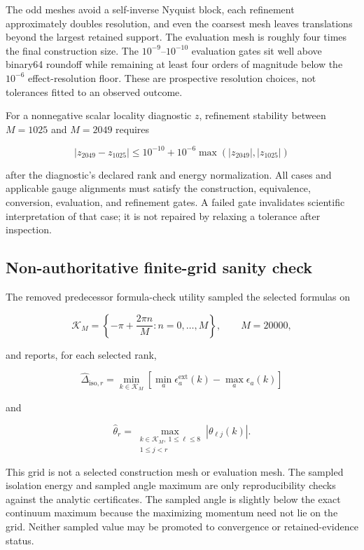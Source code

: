 \documentclass[11pt]{article}
\begin{document}
The odd meshes avoid a self-inverse Nyquist block, each refinement approximately doubles
resolution, and even the coarsest mesh leaves translations beyond the largest retained
support. The evaluation mesh is roughly four times the final construction size. The
$10^{-9}$--$10^{-10}$ evaluation gates sit well above binary64 roundoff while remaining
at least four orders of magnitude below the $10^{-6}$ effect-resolution floor. These are
prospective resolution choices, not tolerances fitted to an observed outcome.

For a nonnegative scalar locality diagnostic $z$, refinement stability between
$M=1025$ and $M=2049$ requires

\[
|z_{2049}-z_{1025}|\leq10^{-10}+10^{-6}
\max(|z_{2049}|,|z_{1025}|)
\]

after the diagnostic's declared rank and energy normalization. All cases and applicable
gauge alignments must satisfy the construction, equivalence, conversion, evaluation, and
refinement gates. A failed gate invalidates scientific interpretation of that case; it
is not repaired by relaxing a tolerance after inspection.

\subsection{Non-authoritative finite-grid sanity check}

The removed predecessor formula-check utility sampled the selected formulas on

\[
\mathcal K_M=\left\{-\pi+\frac{2\pi n}{M}:n=0,\ldots,M\right\},
\qquad M=20000,
\]

and reports, for each selected rank,

\[
\widehat\Delta_{\mathrm{iso},r}
=\min_{k\in\mathcal K_M}
\left[\min_a\epsilon_a^{\mathrm{ext}}(k)-\max_a\epsilon_a(k)\right]
\]

and

\[
\widehat\theta_r
=\max_{\substack{k\in\mathcal K_M,\ 1\leq\ell\leq8\\1\leq j<r}}
|\theta_{\ell j}(k)|.
\]

This grid is not a selected construction mesh or evaluation mesh. The sampled isolation
energy and sampled angle maximum are only reproducibility checks against the analytic
certificates. The sampled angle is slightly below the exact continuum maximum because
the maximizing momentum need not lie on the grid. Neither sampled value may be promoted
to convergence or retained-evidence status.
\end{document}
